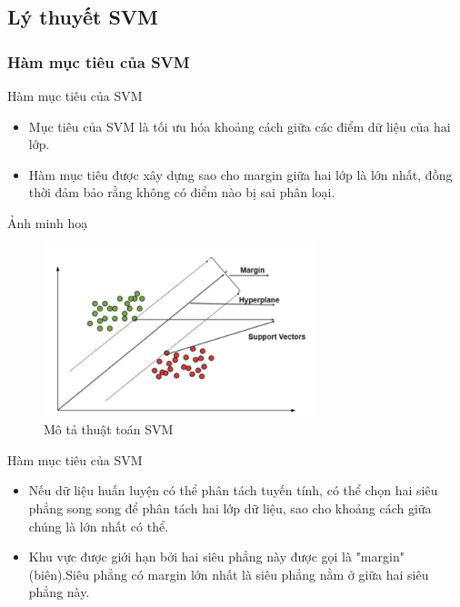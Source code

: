 \documentclass[serif, aspectratio=169]{beamer}
\begin{document}
	\subsection{Lý thuyết SVM}
	\subsubsection{Hàm mục tiêu của SVM}
	\begin{frame}{Hàm mục tiêu của SVM}
		\begin{itemize}
			\item Mục tiêu của SVM là tối ưu hóa khoảng cách giữa các điểm dữ liệu của hai lớp. 
			\item Hàm mục tiêu được xây dựng sao cho margin giữa hai lớp là lớn nhất, đồng thời đảm bảo rằng không có điểm nào bị sai phân loại.
		\end{itemize}
		
	\end{frame}
	
	\begin{frame}{Ảnh minh hoạ}
		\begin{figure}
			\centering
			\includegraphics[height=5cm]{pic/svm.png}
			\caption{Mô tả thuật toán SVM}
			\label{fig:svm}
		\end{figure}
		
	\end{frame}
	
	
	\begin{frame}{Hàm mục tiêu của SVM}
		\begin{itemize}
			\item Nếu dữ liệu huấn luyện có thể phân tách tuyến tính, có thể chọn hai siêu phẳng song song để phân tách hai lớp dữ liệu, sao cho khoảng cách giữa chúng là lớn nhất có thể. 
			\item Khu vực được giới hạn bởi hai siêu phẳng này được gọi là "margin" (biên).Siêu phẳng có margin lớn nhất là siêu phẳng nằm ở giữa hai siêu phẳng này. 
		\end{itemize}
		
	\end{frame}
	
\end{document}
